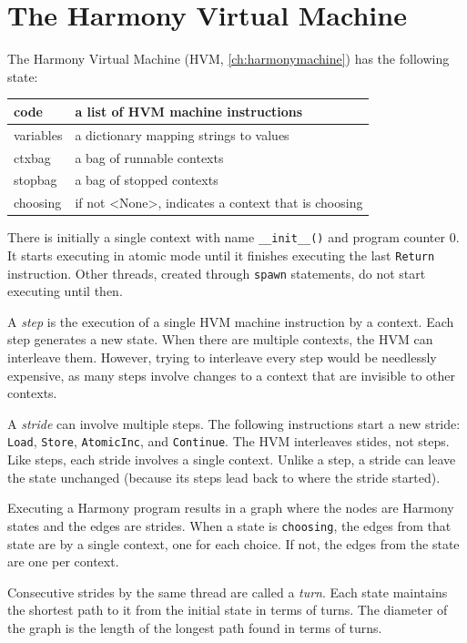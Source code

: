 \documentclass{report}
\begin{document}
\chapter{The Harmony Virtual Machine}\label{app:hvm}

The Harmony Virtual Machine (HVM, \autoref{ch:harmonymachine})
has the following state:

\vspace{1em}
\begin{tabular}{|l|l|}
\hline
code & a list of HVM machine instructions \\
\hline
variables & a dictionary mapping strings to values \\
\hline
ctxbag & a bag of runnable contexts \\
\hline
stopbag & a bag of stopped contexts \\
\hline
choosing & if not <{None}>, indicates a context that is choosing \\
\hline
\end{tabular}
\vspace{1em}

There is initially a single context with name
\texttt{\_\_init\_\_()} and program counter 0.  It starts executing
in atomic mode until it finishes executing the last
\texttt{Return} instruction.
Other threads, created through \texttt{spawn} statements, do not
start executing until then.

A \emph{step} is the execution of a single HVM machine instruction
by a context.
Each step generates a new state.
When there are multiple contexts, the HVM can interleave them.
However, trying to interleave every step would be needlessly expensive,
as many steps involve changes to a context that are invisible to
other contexts.

A \emph{stride}
%
can involve multiple steps.  The following
instructions start a new stride: \texttt{Load}, \texttt{Store},
\texttt{AtomicInc}, and \texttt{Continue}.  The HVM
interleaves stides, not steps.  Like steps, each
stride involves a single context.  Unlike a step, a stride
can leave the state unchanged (because its steps lead back
to where the stride started).

Executing a Harmony program results in a graph where the nodes are Harmony
states and the edges are strides.
When a state is \texttt{choosing}, the edges from that state are
by a single context, one for each choice.  If not, the edges from
the state are one per context.

Consecutive strides by the same thread are called a \emph{turn}.
Each state maintains the shortest path to it from the initial state in terms
of turns.
The diameter of the graph is the length of the longest path found in
terms of turns.
\end{document}
